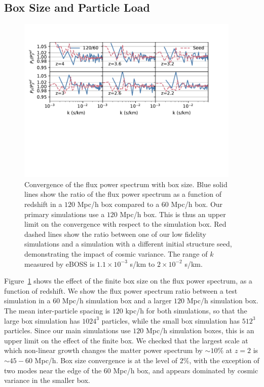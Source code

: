\documentclass[a4paper,11pt]{article}
\newcommand{\Lya}{Lyman-$\alpha$}
\begin{document}
\subsection{Box Size and Particle Load}
\label{sec:boxsize}

\begin{figure}
\includegraphics[width=0.95\textwidth,trim={0 4.5cm 1cm 0},clip]{figures/box-convergence.pdf}
 \caption{Convergence of the flux power spectrum with box size. Blue solid lines show the ratio of the flux power spectrum as a function of redshift in a $120$ Mpc/h box compared to a $60$ Mpc/h box. Our primary simulations use a $120$ Mpc/h box. This is thus an upper limit on the convergence with respect to the simulation box. Red dashed lines show the ratio between one of our low fidelity simulations and a simulation with a different initial structure seed, demonstrating the impact of cosmic variance. The range of $k$ measured by eBOSS is $1.1 \times 10^{-3}$ s/km to $2\times 10^{-2}$ s/km.}
 \label{fig:boxsize}
\end{figure}

Figure~\ref{fig:boxsize} shows the effect of the finite box size on the flux power spectrum, as a function of redshift. We show the flux power spectrum ratio between a test simulation in a $60$ Mpc/h simulation box and a larger $120$ Mpc/h simulation box. The mean inter-particle spacing is $120$ kpc/h for both simulations, so that the large box simulation has $1024^3$ particles, while the small box simulation has $512^3$ particles. Since our main simulations use $120$ Mpc/h simulation boxes, this is an upper limit on the effect of the finite box. We checked that the largest scale at which non-linear growth changes the matter power spectrum by $\sim 10\%$ at $z=2$ is $\sim 45 - 60$ Mpc/h. Box size convergence is at the level of $2\%$, with the exception of two modes near the edge of the $60$ Mpc/h box, and appears dominated by cosmic variance in the smaller box.
\end{document}

